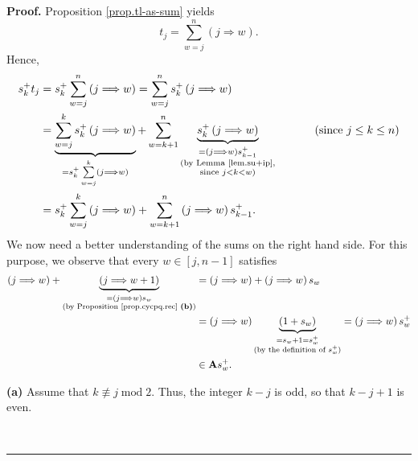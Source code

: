 \documentclass[numbers=enddot,12pt,final,onecolumn,notitlepage]{scrartcl}%
\theoremstyle{definition}
\newenvironment{proof}[1][Proof]{\noindent\textbf{#1.} }{\ \rule{0.5em}{0.5em}}
\let\sumnonlimits\sum
\renewcommand{\sum}{\sumnonlimits\limits}
\begin{document}
\begin{proof}
Proposition \ref{prop.tl-as-sum} yields%
\[
t_{j}=\sum_{w=j}^{n}\left(  j\Longrightarrow w\right)  .
\]
Hence,%
\begin{align}
s_{k}^{+}t_{j}  &  =s_{k}^{+}\sum_{w=j}^{n}\left(  j\Longrightarrow w\right)
=\sum_{w=j}^{n}s_{k}^{+}\left(  j\Longrightarrow w\right) \nonumber\\
&  =\underbrace{\sum_{w=j}^{k}s_{k}^{+}\left(  j\Longrightarrow w\right)
}_{=s_{k}^{+}\sum_{w=j}^{k}\left(  j\Longrightarrow w\right)  }+\sum
_{w=k+1}^{n}\underbrace{s_{k}^{+}\left(  j\Longrightarrow w\right)
}_{\substack{=\left(  j\Longrightarrow w\right)  s_{k-1}^{+}\\\text{(by Lemma
\ref{lem.su+ip},}\\\text{since }j<k<w\text{)}}}\ \ \ \ \ \ \ \ \ \ \left(
\text{since }j\leq k\leq n\right) \nonumber\\
&  =s_{k}^{+}\sum_{w=j}^{k}\left(  j\Longrightarrow w\right)  +\sum
_{w=k+1}^{n}\left(  j\Longrightarrow w\right)  s_{k-1}^{+}. \label{pf.lem.4.2}%
\end{align}
We now need a better understanding of the sums on the right hand side. For
this purpose, we observe that every $w\in\left[  j,n-1\right]  $ satisfies%
\begin{align}
\left(  j\Longrightarrow w\right)  +\underbrace{\left(  j\Longrightarrow
w+1\right)  }_{\substack{=\left(  j\Longrightarrow w\right)  s_{w}\\\text{(by
Proposition \ref{prop.cycpq.rec} \textbf{(b)})}}}  &  =\left(
j\Longrightarrow w\right)  +\left(  j\Longrightarrow w\right)  s_{w}%
\nonumber\\
&  =\left(  j\Longrightarrow w\right)  \underbrace{\left(  1+s_{w}\right)
}_{\substack{=s_{w}+1=s_{w}^{+}\\\text{(by the definition of }s_{w}%
^{+}\text{)}}}=\left(  j\Longrightarrow w\right)  s_{w}^{+}\nonumber\\
&  \in\mathbf{A}s_{w}^{+}. \label{pf.lem.4.twoterms}%
\end{align}


\medskip

\textbf{(a)} Assume that $k\not \equiv j\operatorname{mod}2$. Thus, the
integer $k-j$ is odd, so that $k-j+1$ is even.


\end{proof}
\end{document}
